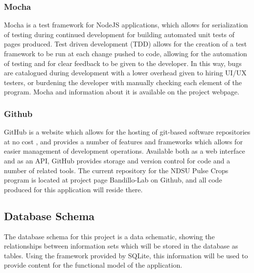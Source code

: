 \documentclass[12pt, letterpaper,oneocolumn]{article}
\begin{document}
		\subsubsection{Mocha}
		Mocha is a test framework for NodeJS applications, which allows for serialization of testing during continued development for building automated unit tests of pages produced. Test driven development (TDD) allows for the creation of a test framework to be run at each change pushed to code, allowing for the automation of testing and for clear feedback to be given to the developer. In this way, bugs are catalogued during development with a lower overhead given to hiring UI/UX testers, or burdening the developer with manually checking each element of the program. Mocha and information about it is available on the project webpage. \cite{mocha}
		\subsubsection{Github}
		GitHub is a website which allows for the hosting of git-based software repositories at no cost \cite{git}, and provides a number of features and frameworks which allows for easier management of development operations. Available both as a web interface and as an API, GitHub provides storage and version control for code and a number of related tools. The current repository for the NDSU Pulse Crops program is located at project page Bandillo-Lab on Github, and all code produced for this application will reside there.
	\subsection{Database Schema}
	The database schema for this project is a data schematic, showing the relationships between information sets which will be stored in the database as tables. Using the framework provided by SQLite, this information will be used to provide content for the functional model of the application. \\
\end{document}
